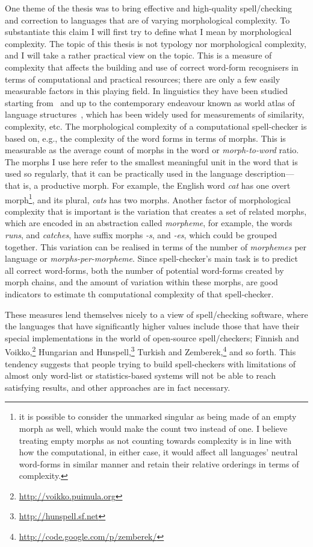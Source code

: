 \documentclass[officiallayout]{unihelcompling}
\begin{document}
One theme of the thesis was to bring effective and high-quality
spell\-/checking and correction to languages that are of varying
\gls{morphological complexity}.  To substantiate this claim I will first try to
define what I mean by morphological complexity.  The topic of this thesis is
not typology nor morphological complexity, and I will take a rather practical
view on the topic.  This is a measure of complexity that affects the building
and use of correct word-form recognisers in terms of computational and
practical resources; there are only a few easily measurable factors in this
playing field. In linguistics they have been studied starting
from~\citet{greenberg1960quantitative} and up to the contemporary endeavour
known as world atlas of language structures~\citep{wals}, which has been widely
used for measurements of similarity, complexity, etc.  The morphological
complexity of a computational spell-checker is based on, e.g., the complexity
of the word forms in terms of \glspl{morph}.  This is measurable as the average
count of morphs in the word or \emph{morph-to-word} ratio. The morphs I use
here refer to the smallest meaningful unit in the word that is used so
regularly, that it can be practically used in the language description---that
is, a productive morph. For example, the English word \emph{cat} has one overt
morph\footnote{it is possible to consider the unmarked singular as being made
    of an empty morph as well, which would make the count two instead of one. I
    believe treating empty morphs as not counting towards complexity is in line
    with how the computational, in either case, it would affect all languages'
neutral word-forms in similar manner and retain their relative orderings in
terms of complexity.}, and its plural, \emph{cats} has two morphs.  Another
factor of morphological complexity that is important is the variation that
creates a set of related morphs, which are encoded in an abstraction called
\emph{morpheme}, for example, the words \emph{runs}, and \emph{catches}, have
suffix morphs \emph{-s}, and \emph{-es}, which could be grouped together. This
variation can be realised in terms of the number of \emph{morphemes} per
language or \emph{morphs-per-morpheme}. Since spell-checker's main task is to
predict all correct word-forms, both the number of potential word-forms created
by morph chains, and the amount of variation within these morphs, are good
indicators to estimate th computational complexity of that spell-checker.

These measures lend themselves nicely to a view of spell\-/checking
software, where the languages that have significantly higher values 
include those that have their special implementations in the
world of open-source spell\-/checkers; Finnish and
Voikko,\footnote{\url{http://voikko.puimula.org}} Hungarian and
Hunspell,\footnote{\url{http://hunspell.sf.net}} Turkish and
Zemberek,\footnote{\url{http://code.google.com/p/zemberek/}} and so forth.
This tendency suggests that people trying to build spell-checkers with
limitations of almost only word-list or statistics-based systems will not be
able to reach satisfying results, and other approaches are in fact necessary.
\end{document}
